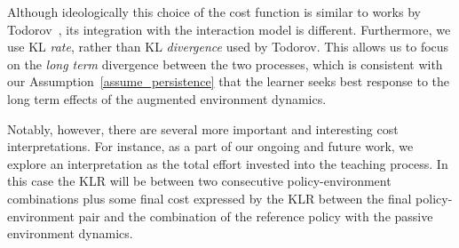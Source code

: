 Although ideologically this choice of the cost function is similar to
works by
Todorov~\cite{todorov_2009_framework,todorov_2009_framework_sup}, its
integration with the interaction model is different. Furthermore, we
use KL {\em rate}, rather than KL {\em divergence} used by
Todorov. This allows us to focus on the {\em long term} divergence
between the two processes, which is consistent with our
Assumption~\ref{assume_persistence} that the learner seeks best
response to the long term effects of the augmented environment
dynamics.

Notably, however, there are several more important and interesting
cost interpretations. For instance, as a part of our ongoing and
future work, we explore an interpretation as the total effort invested
into the teaching process. In this case the KLR will be between two
consecutive policy-environment combinations plus some final cost
expressed by the KLR between the final policy-environment pair and the
combination of the reference policy with the passive environment
dynamics.


